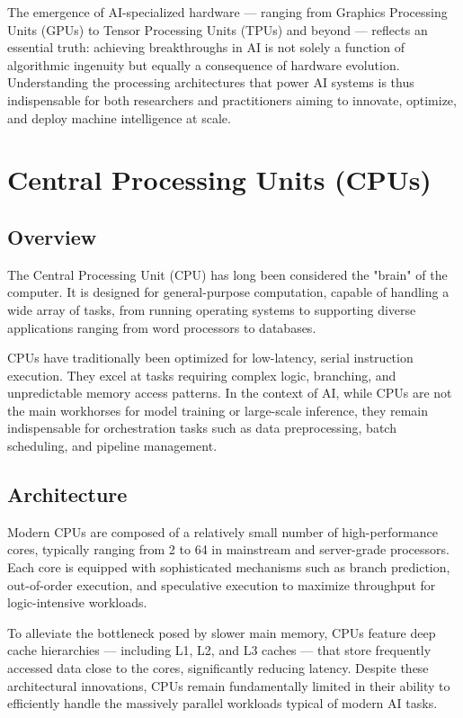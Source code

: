 \documentclass[openany]{book}
\begin{document}
The emergence of AI-specialized hardware — ranging from Graphics Processing 
Units (GPUs) to Tensor Processing Units (TPUs) and beyond — reflects an 
essential truth: achieving breakthroughs in AI is not solely a function of 
algorithmic ingenuity but equally a consequence of hardware evolution. 
Understanding the processing architectures that power AI systems is thus 
indispensable for both researchers and practitioners aiming to innovate, 
optimize, and deploy machine intelligence at scale.

\section{Central Processing Units (CPUs)}

\subsection{Overview}
The Central Processing Unit (CPU) has long been considered the "brain" of the 
computer. It is designed for general-purpose computation, capable of handling a 
wide array of tasks, from running operating systems to supporting diverse 
applications ranging from word processors to databases.

CPUs have traditionally been optimized for low-latency, serial instruction 
execution. They excel at tasks requiring complex logic, branching, and 
unpredictable memory access patterns. In the context of AI, while CPUs are not 
the main workhorses for model training or large-scale inference, they remain 
indispensable for orchestration tasks such as data preprocessing, batch 
scheduling, and pipeline management.

\subsection{Architecture}
Modern CPUs are composed of a relatively small number of high-performance cores, 
typically ranging from 2 to 64 in mainstream and server-grade processors. Each 
core is equipped with sophisticated mechanisms such as branch prediction, 
out-of-order execution, and speculative execution to maximize throughput for 
logic-intensive workloads.

To alleviate the bottleneck posed by slower main memory, CPUs feature deep cache 
hierarchies — including L1, L2, and L3 caches — that store frequently accessed 
data close to the cores, significantly reducing latency. Despite these 
architectural innovations, CPUs remain fundamentally limited in their ability to 
efficiently handle the massively parallel workloads typical of modern AI tasks.
\end{document}
